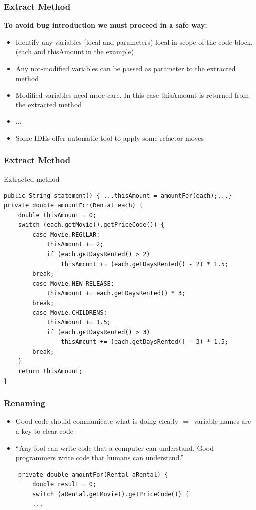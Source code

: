 \documentclass{beamer}
\begin{document}
\begin{frame}
  \frametitle{Extract Method}
  \textbf{To avoid bug introduction we must proceed in a safe way:}
   \begin{itemize}
  		\item Identify any variables (local and parameters) local in scope of the code block. (each and thisAmount in the example)
		\item Any not-modified variables can be passed as parameter to the extracted method
		\item Modified variables need more care. In this case thisAmount is returned from the extracted method
		\item ...		
		\item Some IDEs offer automatic tool to apply some refactor moves
  \end{itemize}
\end{frame}

\begin{frame}[containsverbatim]
	\frametitle{Extract Method}
	Extracted method \\
	\begin{lstlisting}
public String statement() { ...thisAmount = amountFor(each);...}
private double amountFor(Rental each) {
	double thisAmount = 0;
	switch (each.getMovie().getPriceCode()) {
		case Movie.REGULAR:
			thisAmount += 2;
			if (each.getDaysRented() > 2)
				thisAmount += (each.getDaysRented() - 2) * 1.5;
		break;
		case Movie.NEW_RELEASE:
			thisAmount += each.getDaysRented() * 3;
		break;
		case Movie.CHILDRENS:
			thisAmount += 1.5;
			if (each.getDaysRented() > 3)
				thisAmount += (each.getDaysRented() - 3) * 1.5;
		break;
	}
	return thisAmount;
}
\end{lstlisting}
\end{frame}

\begin{frame}[containsverbatim]
  \frametitle{Renaming}
   \begin{itemize}
     \item Good code should communicate what is doing clearly $\Rightarrow$ variable names are a key to clear code
   \item  ``Any fool can write code that a computer can understand. Good programmers write
code that humans can understand.''
	\end{itemize}
	\begin{lstlisting}
	private double amountFor(Rental aRental) {
		double result = 0;
		switch (aRental.getMovie().getPriceCode()) {
		...
	\end{lstlisting}
\end{frame}
\end{document}

